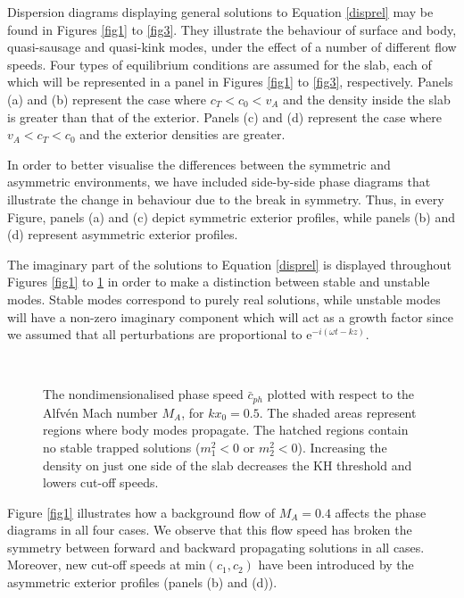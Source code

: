 Dispersion diagrams displaying general solutions to Equation \eqref{disprel} may be found in Figures \ref{fig1} to \ref{fig3}. They illustrate the behaviour of surface and body, quasi-sausage and quasi-kink modes, under the effect of a number of different flow speeds. Four types of equilibrium conditions are assumed for the slab, each of which will be represented in a panel in Figures \ref{fig1} to \ref{fig3}, respectively. Panels (a) and (b) represent the case where $c_T < c_0 < v_A$ and the density inside the slab is greater than that of the exterior. Panels (c) and (d) represent the case where $v_A < c_T < c_0$ and the exterior densities are greater.

In order to better visualise the differences between the symmetric and asymmetric environments, we have included side-by-side phase diagrams that illustrate the change in behaviour due to the break in symmetry. Thus, in every Figure, panels (a) and (c) depict symmetric exterior profiles, while panels (b) and (d) represent asymmetric exterior profiles.

The imaginary part of the solutions to Equation \eqref{disprel} is displayed throughout Figures \ref{fig1} to \ref{flow1} in order to make a distinction between stable and unstable modes. Stable modes correspond to purely real solutions, while unstable modes will have a non-zero imaginary component which will act as a growth factor since we assumed that all perturbations are proportional to $\mathrm{e}^{-i (\omega t - k z)}$.

\begin{figure}[ht]
\vspace{-4cm}
\centering
{}
\\
\caption{The nondimensionalised phase speed $\bar c_{ph}$ plotted with respect to the Alfv\'en Mach number $M_A$, for $k x_0 = 0.5$. The shaded areas represent regions where body modes propagate. The hatched regions contain no stable trapped solutions ($m_1^2 < 0$ or $m_2^2 < 0$). Increasing the density on just one side of the slab decreases the KH threshold and lowers cut-off speeds.}
\label{flow1}
\end{figure}

Figure \ref{fig1} illustrates how a background flow of $M_A = 0.4$ affects the phase diagrams in all four cases. We observe that this flow speed has broken the symmetry between forward and backward propagating solutions in all cases. Moreover, new cut-off speeds at min$(c_1, c_2)$ have been introduced by the asymmetric exterior profiles (panels (b) and (d)).

